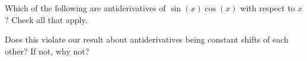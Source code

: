 \documentclass{ximera}
\author{Steven Gubkin}
\begin{document}
\begin{exercise}



Which of the following are antiderivatives of $\sin(x)\cos(x)$ with respect to $x$?  Check all that apply.

\begin{selectAll}
\end{selectAll}

Does this violate our result about antiderivatives being constant shifts of each other?  If not, why not?

\end{exercise}
\end{document}
